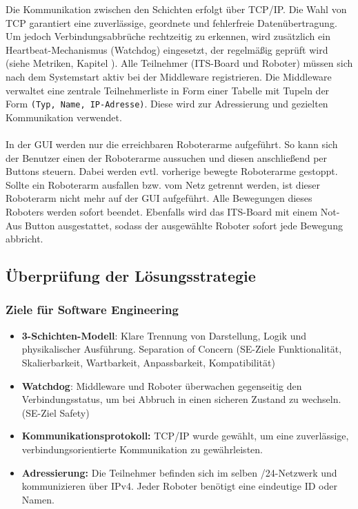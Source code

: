 Die Kommunikation zwischen den Schichten erfolgt über TCP/IP. Die Wahl von TCP garantiert eine zuverlässige, geordnete und fehlerfreie Datenübertragung. Um jedoch Verbindungsabbrüche rechtzeitig zu erkennen, wird zusätzlich ein Heartbeat-Mechanismus (Watchdog) eingesetzt, der regelmäßig geprüft wird (siehe Metriken, Kapitel 
). Alle Teilnehmer (ITS-Board und Roboter) müssen sich nach dem Systemstart aktiv bei der Middleware registrieren. Die Middleware verwaltet eine zentrale Teilnehmerliste in Form einer Tabelle mit Tupeln der Form \texttt{(Typ, Name, IP-Adresse)}. Diese wird zur Adressierung und gezielten Kommunikation verwendet. %
\\\\
In der GUI werden nur die erreichbaren Roboterarme aufgeführt. So kann sich der Benutzer einen der Roboterarme aussuchen und diesen anschließend per Buttons steuern. Dabei werden evtl. vorherige bewegte Roboterarme gestoppt. Sollte ein Roboterarm ausfallen bzw. vom Netz getrennt werden, ist dieser Roboterarm nicht mehr auf der GUI aufgeführt. Alle Bewegungen dieses Roboters werden sofort beendet. Ebenfalls wird das ITS-Board mit einem Not-Aus Button ausgestattet, sodass der ausgewählte Roboter sofort jede Bewegung abbricht.


\subsection*{Überprüfung der Lösungsstrategie}
\subsubsection*{Ziele für Software Engineering}

\begin{itemize}
	\item \textbf{3-Schichten-Modell}: Klare Trennung von Darstellung, Logik und physikalischer Ausführung. Separation of Concern (SE-Ziele Funktionalität, Skalierbarkeit, Wartbarkeit, Anpassbarkeit, Kompatibilität)
	\item \textbf{Watchdog}: Middleware und Roboter überwachen gegenseitig den Verbindungsstatus, um bei Abbruch in einen sicheren Zustand zu wechseln. (SE-Ziel Safety)
	\item \textbf{Kommunikationsprotokoll:} TCP/IP wurde gewählt, um eine zuverlässige, verbindungsorientierte Kommunikation zu gewährleisten.
	\item \textbf{Adressierung:} Die Teilnehmer befinden sich im selben /24-Netzwerk und kommunizieren über IPv4. Jeder Roboter benötigt eine eindeutige ID oder Namen.
\end{itemize}

